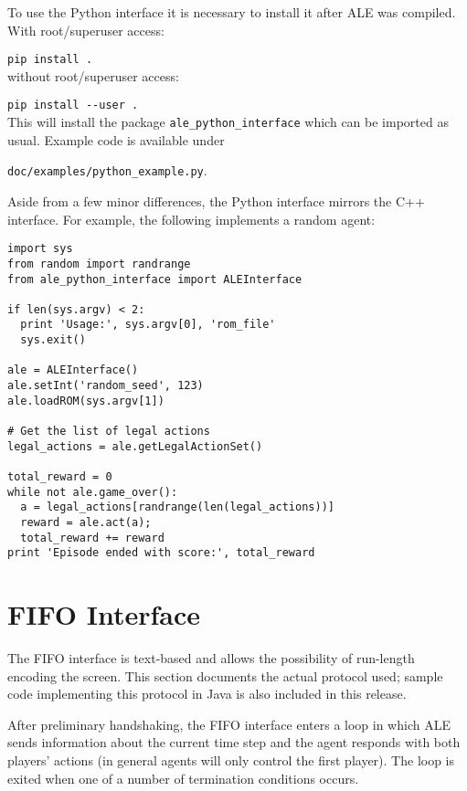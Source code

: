 \documentclass[12pt]{article}
\begin{document}
To use the Python interface it is necessary to install it after ALE was compiled. With root/superuser access:

\verb+pip install .+\\

without root/superuser access:

\verb+pip install --user .+\\

This will install the package \verb+ale_python_interface+ which can be imported as usual. Example code is available under 
\begin{center} \verb+doc/examples/python_example.py+. \end{center}

Aside from a few minor differences, the Python interface mirrors the C++ interface. For example, the following implements a random agent: 

\begin{verbatim}
import sys
from random import randrange
from ale_python_interface import ALEInterface

if len(sys.argv) < 2:
  print 'Usage:', sys.argv[0], 'rom_file'
  sys.exit()

ale = ALEInterface()
ale.setInt('random_seed', 123)
ale.loadROM(sys.argv[1])

# Get the list of legal actions
legal_actions = ale.getLegalActionSet()

total_reward = 0
while not ale.game_over():
  a = legal_actions[randrange(len(legal_actions))]
  reward = ale.act(a);
  total_reward += reward
print 'Episode ended with score:', total_reward
\end{verbatim}

\section{FIFO Interface}\label{sec:pipes_interface}

The FIFO interface is text-based and allows the possibility of run-length encoding the screen. This section documents the actual protocol used; sample code implementing this protocol in Java is also included in this release.

After preliminary handshaking, the FIFO interface enters a loop in which ALE sends information about the current time step and the agent responds with both players' actions (in general agents will only control the first player). The loop is exited when one of a number of termination conditions occurs.
\end{document}
